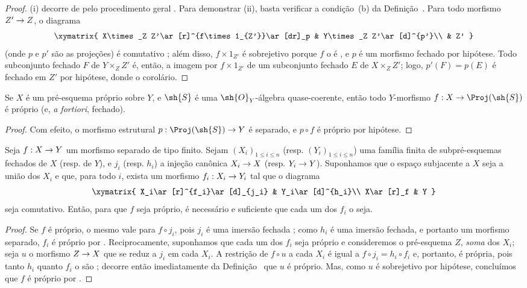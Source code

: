 \documentclass[oneside,10pt]{amsart}
\makeatletter
\renewcommand{\leq}{\leqslant}
\newcommand{\ega@arrow}[2]{\mathchoice{#1}{#2}{#2}{#2}}
\renewcommand{\to}{\ega@arrow{\longrightarrow}{\rightarrow}}
\newcommand{\oldpage}[2][]{\marginnote{\normalfont\footnotesize\textbf{#1}~|~#2}\ignorespaces}
\let\EGAOriginalLabel\label
\renewcommand{\label}[1]{\phantomsection\EGAOriginalLabel{#1}}
\makeatother
\begin{document}
\begin{proof}
(i) decorre de  pelo procedimento geral .
Para demonstrar (ii), basta verificar a condição~(b) da Definição~.
Para todo morfismo $Z'\to Z$, o diagrama
\[
  \xymatrix{
    X\times_Z Z'\ar[r]^{f\times1_{Z'}}\ar[dr]_p &
    Y\times_Z Z'\ar[d]^{p'}\\
    & Z'
  }
\]
(onde $p$ e $p'$ são as projeções) é comutativo ;
além disso, $f\times1_{Z'}$ é sobrejetivo porque $f$ o é , e $p$ é um morfismo fechado por hipótese.
Todo subconjunto fechado $F$ de $Y\times_Z Z'$ é, então, a imagem por $f\times1_{Z'}$ de um subconjunto fechado $E$ de $X\times_Z Z'$; logo, $p'(F)=p(E)$ é fechado em $Z'$ por hipótese, donde o corolário.
\end{proof}

\begin{corollary}[5.4.4]
\label{II.5.4.4}
Se $X$ é um pré-esquema próprio sobre $Y$, e $\sh{S}$ é uma $\sh{O}_Y$-álgebra quase-coerente, então todo $Y$-morfismo $f:X\to\Proj(\sh{S})$ é próprio (e, \emph{a fortiori}, fechado).
\end{corollary}

\begin{proof}
Com efeito, o morfismo estrutural $p:\Proj(\sh{S})\to Y$ é separado, e $p\circ f$ é próprio por hipótese.
\end{proof}

\begin{corollary}[5.4.5]
\label{II.5.4.5}
Seja $f:X\to Y$ um morfismo separado de tipo finito.
Sejam $(X_i)_{1\leq i\leq n}$ (resp. $(Y_i)_{1\leq i\leq n}$) uma família finita de subpré-esquemas fechados de $X$ (resp. de $Y$), e $j_i$ (resp. $h_i$) a injeção canônica $X_i\to X$ (resp. $Y_i\to Y$).
Suponhamos que o espaço subjacente a $X$ seja a união dos $X_i$ e que, para todo $i$, exista um morfismo $f_i:X_i\to Y_i$ tal que o diagrama
\[
  \xymatrix{
    X_i\ar[r]^{f_i}\ar[d]_{j_i} &
    Y_i\ar[d]^{h_i}\\
    X\ar[r]_f &
    Y
  }
\]
seja comutativo.
Então, para que $f$ seja próprio, é necessário e suficiente que cada um dos $f_i$ o seja.
\end{corollary}
\oldpage[II]{102}
\begin{proof}
Se $f$ é próprio, o mesmo vale para $f\circ j_i$, pois $j_i$ é uma imersão fechada ;
como $h_i$ é uma imersão fechada, e portanto um morfismo separado, $f_i$ é próprio por .
Reciprocamente, suponhamos que cada um dos $f_i$ seja próprio e consideremos o pré-esquema $Z$, \emph{soma} dos $X_i$; seja $u$ o morfismo $Z\to X$ que se reduz a $j_i$ em cada $X_i$.
A restrição de $f\circ u$ a cada $X_i$ é igual a $f\circ j_i=h_i\circ f_i$ e, portanto, é própria, pois tanto $h_i$ quanto $f_i$ o são ;
decorre então imediatamente da Definição~ que $u$ é próprio.
Mas, como $u$ é sobrejetivo por hipótese, concluímos que $f$ é próprio por .
\end{proof}
\end{document}
